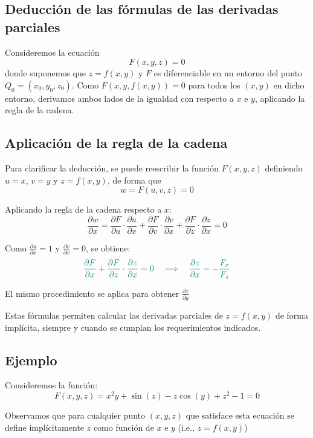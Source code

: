 \documentclass{article}
\begin{document}
\subsection*{Deducción de las fórmulas de las derivadas parciales}

Consideremos la ecuación
\[
F(x,y,z) = 0
\]
donde suponemos que \( z = f(x,y) \) y \( F \) es diferenciable en un entorno del punto \( Q_0 = (x_0, y_0, z_0) \). Como \( F(x,y,f(x,y)) = 0 \) para todos los \( (x,y) \) en dicho entorno, derivamos ambos lados de la igualdad con respecto a \( x \) e \( y \), aplicando la regla de la cadena.

\subsection*{Aplicación de la regla de la cadena}

Para clarificar la deducción, se puede reescribir la función \( F(x,y,z) \) definiendo \( u = x \), \( v = y \) y \( z = f(x,y) \), de forma que
\[
w = F(u,v,z) = 0
\]

Aplicando la regla de la cadena respecto a \( x \):
\[
\frac{\partial w}{\partial x} = \frac{\partial F}{\partial u} \cdot \frac{\partial u}{\partial x} + \frac{\partial F}{\partial v} \cdot \frac{\partial v}{\partial x} + \frac{\partial F}{\partial z} \cdot \frac{\partial z}{\partial x} = 0
\]

Como \( \frac{\partial u}{\partial x} = 1 \) y \( \frac{\partial v}{\partial x} = 0 \), se obtiene:
\[
\color{teal}
\frac{\partial F}{\partial x} + \frac{\partial F}{\partial z} \cdot \frac{\partial z}{\partial x} = 0 \quad \Longrightarrow \quad \frac{\partial z}{\partial x} = -\frac{F_x}{F_z}
\]

El mismo procedimiento se aplica para obtener \( \frac{\partial z}{\partial y} \)

Estas fórmulas permiten calcular las derivadas parciales de \( z = f(x,y) \) de forma implícita, siempre y cuando se cumplan los requerimientos indicados.
\subsection*{Ejemplo}

Consideremos la función:
\[
F(x,y,z) = x^2y + \sin(z) - z\cos(y) + z^2 - 1 = 0
\]

Observamos que para cualquier punto \((x,y,z)\) que satisface esta ecuación se define implícitamente \( z \) como función de \( x \) e \( y \) (i.e., \( z = f(x,y) \))
\end{document}
